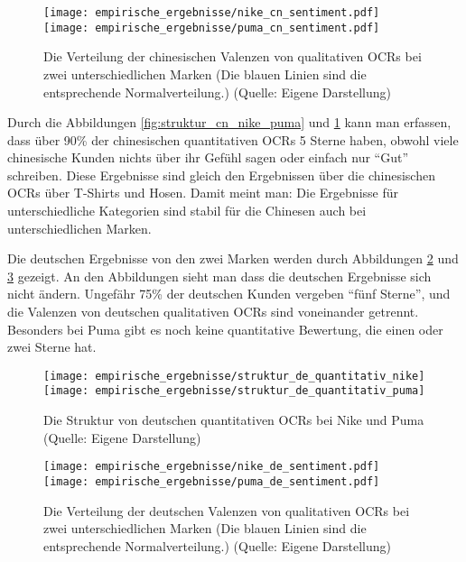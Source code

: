 \begin{figure}[h]
    \texttt{[image: empirische\_ergebnisse/nike\_cn\_sentiment.pdf]}
    \endminipage\hfill
    \texttt{[image: empirische\_ergebnisse/puma\_cn\_sentiment.pdf]}
    \endminipage 
    \caption[Die Verteilung der chinesischen Valenzen von qualitativen OCRs bei zwei unterschiedlichen Marken]{Die Verteilung der chinesischen Valenzen von qualitativen \ac{OCRs} bei zwei unterschiedlichen Marken (Die blauen Linien sind die entsprechende Normalverteilung.) (Quelle: Eigene Darstellung)}
    \label{fig:valenz_cn_marken}
\end{figure}

Durch die Abbildungen \ref{fig:struktur_cn_nike_puma} und \ref{fig:valenz_cn_marken} kann man erfassen, dass über 90\% der chinesischen quantitativen \ac{OCRs} 5 Sterne haben, obwohl viele chinesische Kunden  nichts über ihr Gefühl sagen oder einfach nur ``Gut'' schreiben. Diese Ergebnisse sind gleich den Ergebnissen über die chinesischen \ac{OCRs} über T-Shirts und Hosen. Damit meint man: Die Ergebnisse für unterschiedliche Kategorien sind stabil für die Chinesen auch bei unterschiedlichen Marken.

Die deutschen Ergebnisse von den zwei Marken werden durch Abbildungen \ref{fig:struktur_de_nike_puma} und \ref{fig:valenz_de_marken} gezeigt. An den Abbildungen sieht man dass die deutschen Ergebnisse sich nicht ändern. Ungefähr 75\% der deutschen Kunden vergeben ``fünf Sterne'', und die Valenzen von deutschen qualitativen \ac{OCRs} sind voneinander getrennt. Besonders bei Puma gibt es noch keine quantitative Bewertung, die einen oder zwei Sterne hat.

\begin{figure}[htb]
    {\texttt{[image: empirische\_ergebnisse/struktur\_de\_quantitativ\_nike]}}    
    {\texttt{[image: empirische\_ergebnisse/struktur\_de\_quantitativ\_puma]}}   
    \caption[Die Struktur von deutschen quantitativen OCRs bei Nike und Puma]{Die Struktur von deutschen quantitativen \ac{OCRs} bei Nike und Puma (Quelle: Eigene Darstellung)}
    \label{fig:struktur_de_nike_puma}
\end{figure}

\begin{figure}[h]
    \texttt{[image: empirische\_ergebnisse/nike\_de\_sentiment.pdf]}
    \endminipage\hfill
    \texttt{[image: empirische\_ergebnisse/puma\_de\_sentiment.pdf]}
    \endminipage 
    \caption[Die Verteilung der deutschen Valenzen von qualitativen OCRs bei zwei unterschiedlichen Marken]{Die Verteilung der deutschen Valenzen von qualitativen \ac{OCRs} bei zwei unterschiedlichen Marken (Die blauen Linien sind die entsprechende Normalverteilung.) (Quelle: Eigene Darstellung)}
    \label{fig:valenz_de_marken}
\end{figure}

